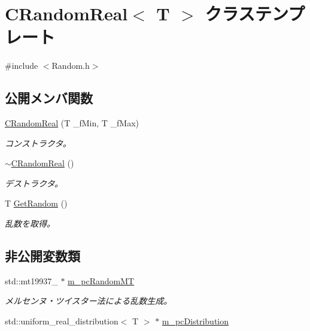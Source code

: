 \hypertarget{class_c_random_real}{}\section{C\+Random\+Real$<$ T $>$ クラステンプレート}
\label{class_c_random_real}


{\ttfamily \#include $<$Random.\+h$>$}

\subsection*{公開メンバ関数}
\begin{DoxyCompactItemize}
\item 
\hyperlink{class_c_random_real_ae4e392ce256d39dd23efd10bb854497b}{C\+Random\+Real} (T \+\_\+f\+Min, T \+\_\+f\+Max)
\begin{DoxyCompactList}\small\item\em コンストラクタ。 \end{DoxyCompactList}\item 
\hyperlink{class_c_random_real_a1816488bda25256c76f4c1398813789a}{$\sim$\+C\+Random\+Real} ()
\begin{DoxyCompactList}\small\item\em デストラクタ。 \end{DoxyCompactList}\item 
T \hyperlink{class_c_random_real_a9c2371d1a531aa18ce4f448fe9c762f6}{Get\+Random} ()
\begin{DoxyCompactList}\small\item\em 乱数を取得。 \end{DoxyCompactList}\end{DoxyCompactItemize}
\subsection*{非公開変数類}
\begin{DoxyCompactItemize}
\item 
std\+::mt19937\+\_ $\ast$ \hyperlink{class_c_random_real_a037817cfa9e79313ea851b03fa1fd4ad}{m\+\_\+pc\+Random\+M\+T}
\begin{DoxyCompactList}\small\item\em メルセンヌ・ツイスター法による乱数生成。 \end{DoxyCompactList}\item 
std\+::uniform\+\_\+real\+\_\+distribution$<$ T $>$ $\ast$ \hyperlink{class_c_random_real_a2cf71bd4ff15374b9b079b38125867e3}{m\+\_\+pc\+Distribution}
\end{DoxyCompactItemize}


